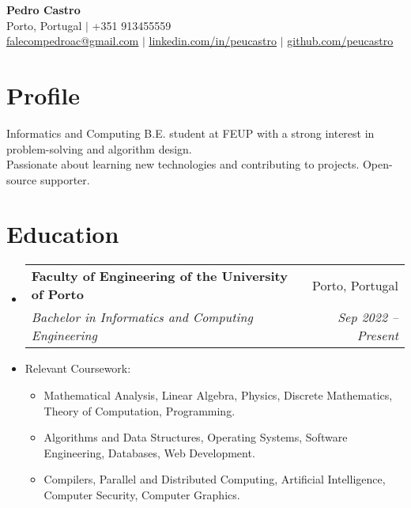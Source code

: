 \documentclass[a4paper,11pt]{article}
\makeatletter
\newcommand{\resumeItem}[1]{
	\item\small{
		{#1 \vspace{-2pt}}
	}
}
\newcommand{\resumeSubheading}[4]{
	\vspace{-2pt}\item
	\begin{tabular*}{0.97\textwidth}[t]{l@{\extracolsep{\fill}}r}
		\textbf{#1} & #2 \\
		\textit{\small#3} & \textit{\small #4} \\
	\end{tabular*}\vspace{-7pt}
}
\newcommand{\resumeSubHeadingListStart}{\begin{itemize}[leftmargin=0.15in, label={}]}
\newcommand{\resumeSubHeadingListEnd}{\end{itemize}}
\newcommand{\resumeItemListStart}{\begin{itemize}}
\newcommand{\resumeItemListEnd}{\end{itemize}\vspace{-5pt}}
\makeatother
\begin{document}
\begin{center}
	\textbf{\Huge Pedro Castro} \\ \vspace{6pt}
	\faMapMarker*{} \small Porto, Portugal $|$ \faPhone{} +351 913455559 \\ \vspace{2pt}
	\faEnvelope{} \href{mailto:falecompedroac@gmail.com}{\underline{falecompedroac@gmail.com}} $|$
	\faLinkedin{} \href{https://linkedin.com/in/peucastro}{\underline{linkedin.com/in/peucastro}} $|$
	\faGithub{} \href{https://github.com/peucastro}{\underline{github.com/peucastro}}
\end{center}

\section{Profile}
\begin{itemize}[leftmargin=0.15in, label={}]
	\small{\item{
	      Informatics and Computing B.E. student at FEUP with a strong interest in problem-solving and algorithm design. \\
	      Passionate about learning new technologies and contributing to projects. Open-source supporter.
	      }}
\end{itemize}

\section{Education}
\resumeSubHeadingListStart%

\resumeSubheading%
{Faculty of Engineering of the University of Porto}{Porto, Portugal}
{Bachelor in Informatics and Computing Engineering \href{https://www.up.pt/feup/en/study/bachelors-degree/undergraduate-programmes/feup/22841/}{\faLink}}{Sep 2022 – Present}
\resumeItem{Relevant Coursework:}
\resumeItemListStart%
\item Mathematical Analysis, Linear Algebra, Physics, Discrete Mathematics, Theory of
Computation, Programming.
\item Algorithms and Data Structures, Operating Systems, Software Engineering,
Databases, Web Development.
\item Compilers, Parallel and Distributed Computing, Artificial Intelligence,
Computer Security, Computer Graphics.\ \resumeItemListEnd%

\resumeSubHeadingListEnd%
\end{document}
